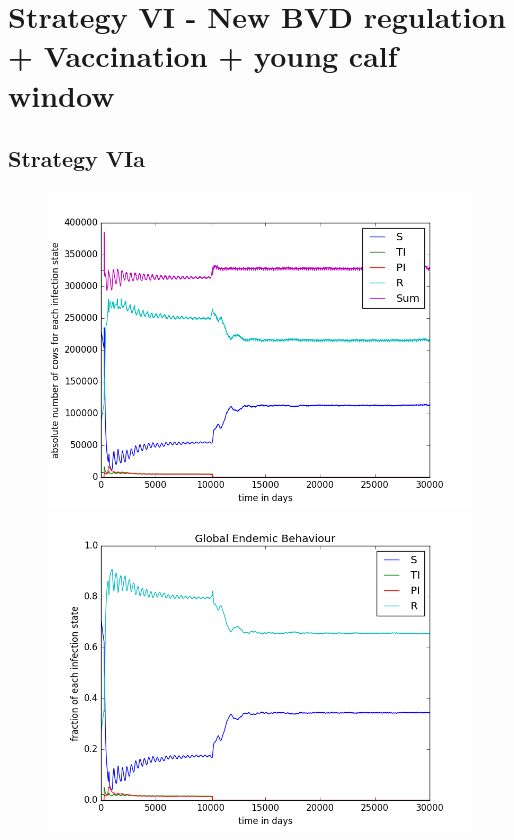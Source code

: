 \section{Strategy VI - New BVD regulation + Vaccination + young calf window} 
\subsection{Strategy VIa}

\begin{figure}[htbp]
\begin{minipage}{0.5\textwidth}
\centering
\noindent\includegraphics[width=0.95\linewidth,height=\textheight,
keepaspectratio]{cont6totalEndemicNumbers.png} 
\end{minipage}
\begin{minipage}{0.5\textwidth}
\centering
\noindent\includegraphics[width=0.95\linewidth,height=\textheight,
keepaspectratio]{cont6endemicFractions.png} 
\end{minipage}
\caption[Endemic Behavior in Containment Strategy One]{}
\label{fig:demographyScen8}
\end{figure}

